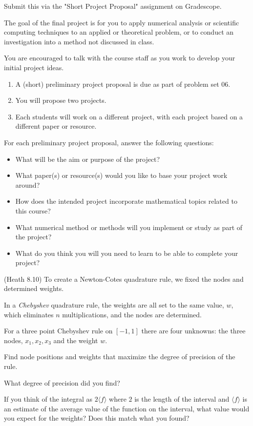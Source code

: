 \documentclass[12pt,letterpaper,noanswers]{exam}
\begin{document}
\begin{questions}
\item Submit this via the "Short Project Proposal" assignment on Gradescope.

The goal of the final project is for you to apply numerical analysis or scientific computing techniques to an applied or theoretical problem, or to conduct an investigation into a method not discussed in class.

{\large You are encouraged to talk with the course staff as you work to develop your initial project ideas.}

\begin{enumerate}
\itemsep0pt
      \item A (short) preliminary project proposal is due as part of problem set 06.
    \item You will propose two projects.
    \item Each students will work on a different project, with each project based on a different paper or resource.
\end{enumerate}

\noindent For each preliminary project proposal, answer the following questions:
\begin{itemize}
\itemsep0pt
\item What will be the aim or purpose of the project?
\item What paper(s) or resource(s) would you like to base your project work around?
\item How does the intended project incorporate mathematical topics related to this course?
\item What numerical method or methods will you implement or study as part of the project?
\item What do you think you will you need to learn to be able to complete your project?
\end{itemize}

\item (Heath 8.10) To create a Newton-Cotes quadrature rule, we fixed the nodes and determined weights.

In a \emph{Chebyshev} quadrature rule, the weights are all set to the same value, $w$, which eliminates $n$ multiplications, and the nodes are determined. 

For a three point Chebyshev rule on $[-1,1]$ there are four unknowns: the three nodes, $x_1, x_2, x_3$ and the weight $w$.
\begin{parts}
\item 
Find node positions and weights that maximize the degree of precision of the rule.  
\item What degree of precision did you find?
\item If you think of the integral as $2\langle f \rangle$ where $2$ is the length of the interval and $\langle f \rangle$ is an estimate of the average value of the function on the interval, what value would you expect for the weights?  Does this match what you found?
\end{parts}


\end{questions}
\end{document}
